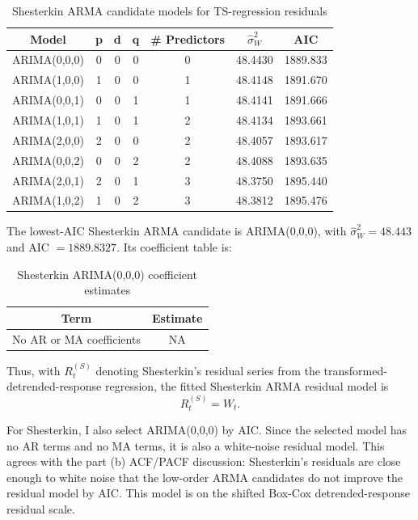 \documentclass[
  10pt,
]{extarticle}
\begin{document}
\begin{center}
\scriptsize
\begin{table}[H]

\caption{\label{tab:p2-arma-shesterkin-table}Shesterkin ARMA candidate models for TS-regression residuals}
\centering
\begin{tabular}[t]{ccccccc}
\toprule
Model & p & d & q & \# Predictors & $\hat{\sigma}_W^2$ & AIC\\
\midrule
ARIMA(0,0,0) & 0 & 0 & 0 & 0 & 48.4430 & 1889.833\\
ARIMA(1,0,0) & 1 & 0 & 0 & 1 & 48.4148 & 1891.670\\
ARIMA(0,0,1) & 0 & 0 & 1 & 1 & 48.4141 & 1891.666\\
ARIMA(1,0,1) & 1 & 0 & 1 & 2 & 48.4134 & 1893.661\\
ARIMA(2,0,0) & 2 & 0 & 0 & 2 & 48.4057 & 1893.617\\
\addlinespace
ARIMA(0,0,2) & 0 & 0 & 2 & 2 & 48.4088 & 1893.635\\
ARIMA(2,0,1) & 2 & 0 & 1 & 3 & 48.3750 & 1895.440\\
ARIMA(1,0,2) & 1 & 0 & 2 & 3 & 48.3812 & 1895.476\\
\bottomrule
\end{tabular}
\end{table}
\normalsize
\end{center}

The lowest-AIC Shesterkin ARMA candidate is ARIMA(0,0,0), with \(\hat{\sigma}_W^2 = 48.443\) and AIC \(= 1889.8327\). Its coefficient table is:

\begin{center}
\scriptsize
\begin{table}[H]

\caption{\label{tab:p2-arma-shesterkin-coef}Shesterkin ARIMA(0,0,0) coefficient estimates}
\centering
\begin{tabular}[t]{cc}
\toprule
Term & Estimate\\
\midrule
No AR or MA coefficients & NA\\
\bottomrule
\end{tabular}
\end{table}
\normalsize
\end{center}

Thus, with \(R_t^{(S)}\) denoting Shesterkin's residual series from the transformed-detrended-response regression, the fitted Shesterkin ARMA residual model is
\[
R_t^{(S)} = W_t.
\]

For Shesterkin, I also select ARIMA(0,0,0) by AIC. Since the selected model has no AR terms and no MA terms, it is also a white-noise residual model. This agrees with the part (b) ACF/PACF discussion: Shesterkin's residuals are close enough to white noise that the low-order ARMA candidates do not improve the residual model by AIC. This model is on the shifted Box-Cox detrended-response residual scale.
\end{document}
